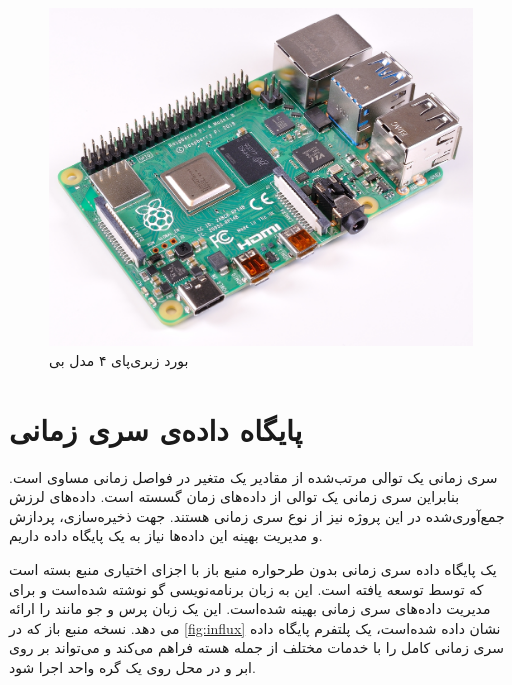 \begin{figure}[!h]
\centering\includegraphics[scale=.2]{raspberry_pi.png}
\caption{بورد زبری‌پای ۴ مدل بی}\label{fig:raspberry_pi}
\end{figure}


\section{پایگاه داده‌ی سری زمانی}

سری زمانی یک توالی مرتب‌شده از مقادیر یک متغیر در فواصل زمانی مساوی است. بنابراین سری زمانی یک توالی از داده‌های زمان گسسته است\cite{naqvi2017time}. داده‌های لرزش جمع‌آوری‌شده در این پروژه نیز از نوع سری زمانی هستند. جهت ذخیره‌سازی، پردازش و مدیریت بهینه این داده‌ها نیاز به یک پایگاه داده داریم.


 یک پایگاه داده سری زمانی بدون طرحواره منبع باز با اجزای اختیاری منبع بسته است که توسط  توسعه یافته است. این به زبان برنامه‌نویسی گو نوشته شده‌است و برای مدیریت داده‌های سری زمانی بهینه شده‌است. این یک زبان پرس و جو مانند  را ارائه می دهد. نسخه منبع باز که در \cref{fig:influx} \cite{influx} نشان داده شده‌است، یک پلتفرم پایگاه داده سری زمانی کامل را با خدمات مختلف از جمله هسته  فراهم می‌کند و می‌تواند بر روی ابر و در محل روی یک گره واحد اجرا شود.

